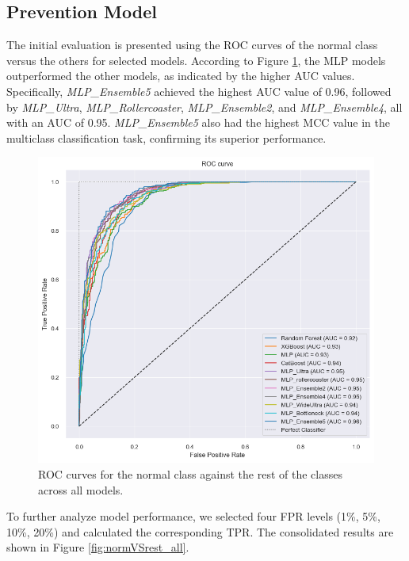 \subsection{Prevention Model}
The initial evaluation is presented using the ROC curves of the normal class versus the others for selected models.
According to Figure \ref{fig:ROC_normVSrest_allmodels}, the MLP models outperformed the other models, as 
indicated by the higher AUC values.
Specifically, \textit{MLP\_Ensemble5} achieved the highest AUC value of 0.96, followed 
by \textit{MLP\_Ultra}, \textit{MLP\_Rollercoaster}, \textit{MLP\_Ensemble2}, 
and \textit{MLP\_Ensemble4}, all with an AUC of 0.95. \textit{MLP\_Ensemble5} also 
had the highest MCC value in the multiclass classification task, confirming its superior performance.

\begin{figure}[H]
    \centering
    \includegraphics[width=1\columnwidth]{./images/ROC_normVSrest_allmodels.png}
    \caption{ROC curves for the normal class against the rest of the classes across all models.}
    \label{fig:ROC_normVSrest_allmodels}
\end{figure}

To further analyze model performance, we selected four FPR levels (1\%, 5\%, 10\%, 20\%) and 
calculated the corresponding TPR. The consolidated results are shown in 
Figure \ref{fig:normVSrest_all}.

